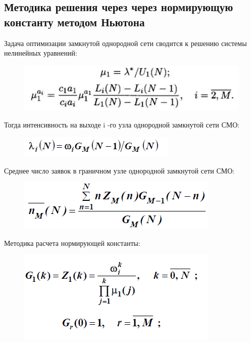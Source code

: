\subsection{Методика решения через через нормирующую константу методом Ньютона}

Задача оптимизации замкнутой однородной сети сводится к решению системы нелинейных уравнений:

\begin{figure}[h!]
	\centering
	\includegraphics[scale = 0.79]{images/p3_4_r.png}
	\label{image:p3_4rx}
\end{figure}

Тогда интенсивность на выходе i -го узла однородной замкнутой сети СМО:

\begin{figure}[h!]
	\centering
	\includegraphics[scale = 0.79]{images/p3_5_1.png}
	\label{image:p3_5_1}
\end{figure}

\clearpage

Среднее число заявок в граничном узле однородной замкнутой сети СМО:

\begin{figure}[h!]
	\centering
	\includegraphics[scale = 0.79]{images/p3_5_2.png}
	\label{image:p3_5_2}
\end{figure}

Методика расчета нормирующей константы:

\begin{figure}[h!]
	\centering
	\includegraphics[scale = 0.79]{images/p3_5_4.png}
	\label{image:p3_5_4}
\end{figure}

